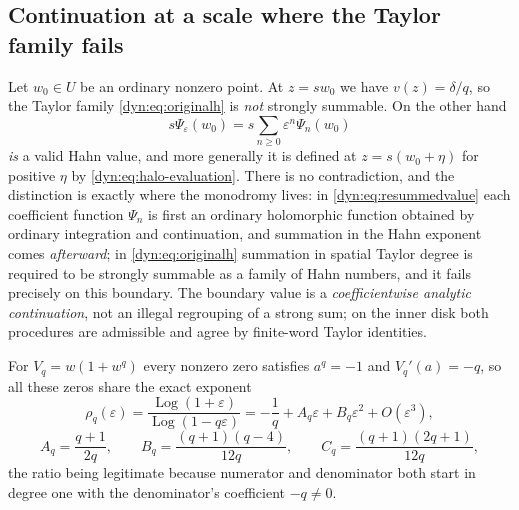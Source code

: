 \documentclass[11pt,letterpaper]{article}
\theoremstyle{definition}
\theoremstyle{remark}
\newcommand{\Log}{\operatorname{Log}}
\newcommand{\eps}{\varepsilon}
\numberwithin{equation}{section}
\begin{document}
\subsection{Continuation at a scale where the Taylor family fails}
\label{dyn:subsec:boundary}

Let $w_0\in U$ be an ordinary nonzero point. At $z=sw_0$ we have
$v(z)=\delta/q$, so the Taylor family \eqref{dyn:eq:originalh} is
\emph{not} strongly summable. On the other hand
\begin{equation}\label{dyn:eq:resummedvalue}
 s\Psi_\eps(w_0)=s\sum_{n\ge0}\eps^{n}\Psi_n(w_0)
\end{equation}
\emph{is} a valid Hahn value, and more generally it is defined at
$z=s(w_0+\eta)$ for positive $\eta$ by
\eqref{dyn:eq:halo-evaluation}. There is no contradiction, and the
distinction is exactly where the monodromy lives: in
\eqref{dyn:eq:resummedvalue} each coefficient function $\Psi_n$ is first an
ordinary holomorphic function obtained by ordinary integration and
continuation, and summation in the Hahn exponent comes \emph{afterward};
in \eqref{dyn:eq:originalh} summation in spatial Taylor degree is required
to be strongly summable as a family of Hahn numbers, and it fails precisely
on this boundary. The boundary value is a \emph{coefficientwise analytic
continuation}, not an illegal regrouping of a strong sum; on the inner disk
both procedures are admissible and agree by finite-word Taylor identities.

For $V_q=w(1+w^{q})$ every nonzero zero satisfies $a^{q}=-1$ and
$V_q'(a)=-q$, so all these zeros share the exact exponent
\begin{equation}\label{dyn:eq:rhoq}
 \rho_q(\eps)=\frac{\Log(1+\eps)}{\Log(1-q\eps)}
 =-\frac1q+A_q\eps+B_q\eps^{2}+O(\eps^{3}),
\end{equation}
\begin{equation}\label{dyn:eq:ABC}
 A_q=\frac{q+1}{2q},\qquad B_q=\frac{(q+1)(q-4)}{12q},\qquad
 C_q=\frac{(q+1)(2q+1)}{12q},
\end{equation}
the ratio being legitimate because numerator and denominator both start in
degree one with the denominator's coefficient $-q\ne0$.
\end{document}
